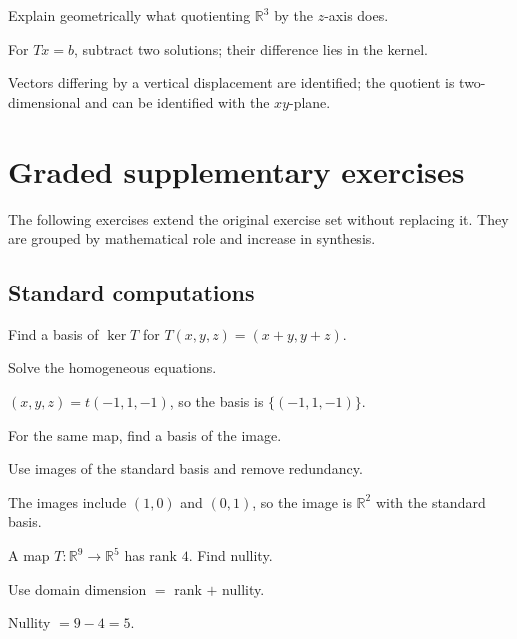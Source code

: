 \begin{exercise}\label{exr:i06-08}
Explain geometrically what quotienting $\mathbb R^3$ by the $z$-axis does.
\end{exercise}
\begin{hint}
For \(Tx=b\), subtract two solutions; their difference lies in the kernel.
\end{hint}
\begin{solution}
Vectors differing by a vertical displacement are identified; the quotient is two-dimensional and can be identified with the $xy$-plane.
\end{solution}


\section{Graded supplementary exercises}
The following exercises extend the original exercise set without replacing it. They are grouped by mathematical role and increase in synthesis.

\subsection*{Standard computations}

\begin{exercise}\label{exr:i06-expand-01}
Find a basis of \(\ker T\) for \(T(x,y,z)=(x+y,y+z)\).
\end{exercise}
\begin{hint}
Solve the homogeneous equations.
\end{hint}
\begin{solution}
\((x,y,z)=t(-1,1,-1)\), so the basis is \(\{(-1,1,-1)\}\).
\end{solution}

\begin{exercise}\label{exr:i06-expand-02}
For the same map, find a basis of the image.
\end{exercise}
\begin{hint}
Use images of the standard basis and remove redundancy.
\end{hint}
\begin{solution}
The images include \((1,0)\) and \((0,1)\), so the image is \(\mathbb R^2\) with the standard basis.
\end{solution}

\begin{exercise}\label{exr:i06-expand-03}
A map \(T:\mathbb R^9\to\mathbb R^5\) has rank \(4\). Find nullity.
\end{exercise}
\begin{hint}
Use domain dimension \(=\) rank \(+\) nullity.
\end{hint}
\begin{solution}
Nullity \(=9-4=5\).
\end{solution}

